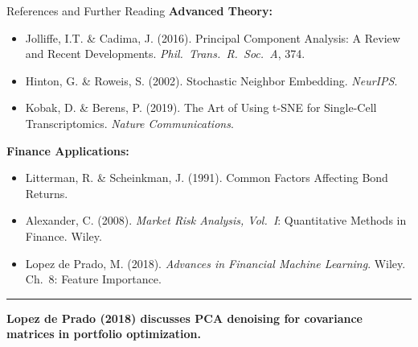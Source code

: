 \documentclass[8pt,aspectratio=169]{beamer}
\newcommand{\bottomnote}[1]{%
\vfill
\vspace{-2mm}
\textcolor{mllavender2}{\rule{\textwidth}{0.4pt}}
\vspace{1mm}
\footnotesize
\textbf{#1}
}
\begin{document}
\begin{frame}[t]{References and Further Reading}
\small
\textbf{Advanced Theory:}
\begin{itemize}
  \item Jolliffe, I.T. \& Cadima, J. (2016). Principal Component Analysis: A Review and Recent Developments. \textit{Phil.\ Trans.\ R.\ Soc.\ A}, 374.
  \item Hinton, G. \& Roweis, S. (2002). Stochastic Neighbor Embedding. \textit{NeurIPS}.
  \item Kobak, D. \& Berens, P. (2019). The Art of Using t-SNE for Single-Cell Transcriptomics. \textit{Nature Communications}.
\end{itemize}

\vspace{0.3em}
\textbf{Finance Applications:}
\begin{itemize}
  \item Litterman, R. \& Scheinkman, J. (1991). Common Factors Affecting Bond Returns.
  \item Alexander, C. (2008). \textit{Market Risk Analysis, Vol.\ I}: Quantitative Methods in Finance. Wiley.
  \item Lopez de Prado, M. (2018). \textit{Advances in Financial Machine Learning}. Wiley. Ch.\ 8: Feature Importance.
\end{itemize}
\bottomnote{Lopez de Prado (2018) discusses PCA denoising for covariance matrices in portfolio optimization.}
\end{frame}
\end{document}
